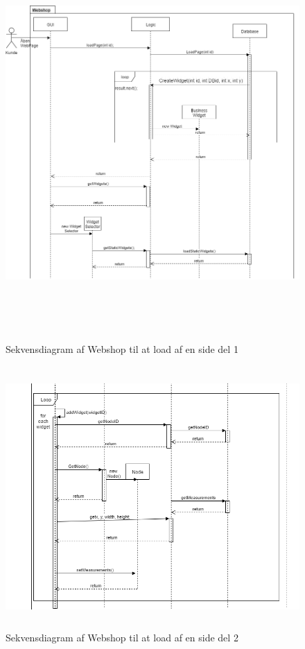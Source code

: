 \begin{figure}[H]
  \includegraphics[width=15cm,height=15cm]
  {elaborationsdokumentet/figurer/analyse/webshop-sekvens-del1.png}
  \caption{Sekvensdiagram af Webshop til at load af en side del 1}
  \label{fig:Sekvensdiagram-CMS-Loadsite11}
\end{figure}

\begin{figure}[H]
  \includegraphics[width=15cm,height=10cm]
  {elaborationsdokumentet/figurer/analyse/webshop-sekvens-del2.png}
  \caption{Sekvensdiagram af Webshop til at load af en side del 2}
  \label{fig:Sekvensdiagram-CMS-Loadsite12}
\end{figure}




